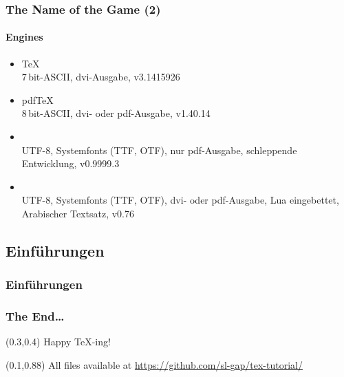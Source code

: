 \documentclass[t,ngerman]{beamer}
\begin{document}
\begin{frame}
  \frametitle{The Name of the Game (2)}
  \framesubtitle{Engines}
  \begin{itemize}
  \item \TeX\\
    7\,bit-ASCII, dvi-Ausgabe, v3.1415926
  \item pdf\TeX\\
    8\,bit-ASCII, dvi- oder pdf-Ausgabe, v1.40.14
  \item {}\\
    UTF-8, Systemfonts (TTF, OTF), nur pdf-Ausgabe, schleppende
    Entwicklung, v0.9999.3
  \item {}\\
    UTF-8, Systemfonts (TTF, OTF), dvi- oder pdf-Ausgabe, Lua
    eingebettet, Arabischer Textsatz, v0.76
  \end{itemize}
\end{frame}

\subsection{Einführungen}

\begin{frame}
  \frametitle{Einführungen}
  \nocite{voss2012,l2short}
  \begingroup
  \printbibliography[heading=none]
  \endgroup
\end{frame}



{
\begin{frame}
  \frametitle{The End\dots}
  \begin{textblock}{10}(0.3,0.4)
    {\Huge\color{red}Happy \TeX-ing!}
  \end{textblock}
  \begin{textblock}{10}(0.1,0.88)
    \small All files available at
    \href{https://github.com/sl-gap/tex-tutorial/}{https://github.com/sl-gap/tex-tutorial/}
  \end{textblock}
\end{frame}
}
\end{document}

